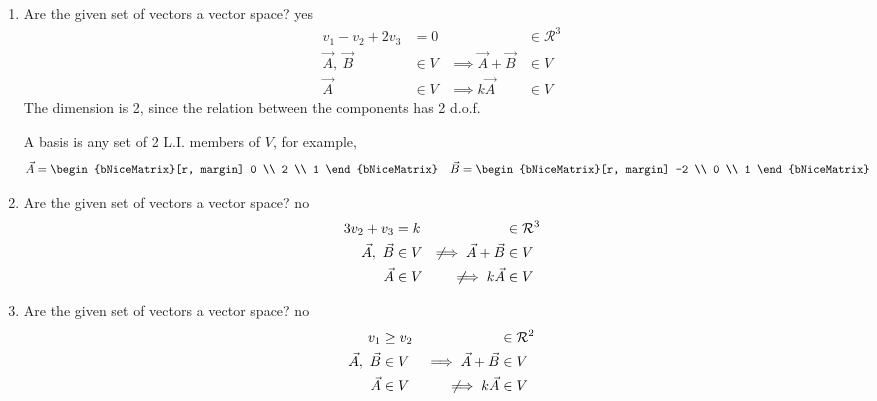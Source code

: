 \begin{enumerate}
    \item Are the given set of vectors a vector space? \textcolor{y_h}{yes}
          \begin{align}
              v_1 - v_2 + 2v_3           & = 0               &
                                         & \in \mathcal{R}^3   \\
              \vec{A},\ \vec{B}          & \in V             &
              \implies \vec{A} + \vec{B} & \in V               \\
              \vec{A}                    & \in V             &
              \implies k\vec{A}          & \in V
          \end{align}
          The dimension is 2, since the relation between the components has 2 d.o.f.
          \par
          A basis is any set of 2 L.I. members of $ V $, for example,
          \begin{align}
              \vec{A} & = \begin{bNiceMatrix}[r, margin]
                              0 \\ 2 \\ 1
                          \end{bNiceMatrix} &
              \vec{B} & = \begin{bNiceMatrix}[r, margin]
                              -2 \\ 0 \\ 1
                          \end{bNiceMatrix}
          \end{align}

    \item Are the given set of vectors a vector space? \textcolor{y_p}{no}
          \begin{align}
              3v_2 + v_3                         & = k               &
                                                 & \in \mathcal{R}^3   \\
              \vec{A},\ \vec{B}                  & \in V             &
              \not\!\!\implies \vec{A} + \vec{B} & \in V               \\
              \vec{A}                            & \in V             &
              \not\!\!\implies k\vec{A}          & \in V
          \end{align}

    \item Are the given set of vectors a vector space? \textcolor{y_p}{no}
          \begin{align}
              v_1                        & \geq v_2          &
                                         & \in \mathcal{R}^2   \\
              \vec{A},\ \vec{B}          & \in V             &
              \implies \vec{A} + \vec{B} & \in V               \\
              \vec{A}                    & \in V             &
              \not\!\!\implies k\vec{A}  & \in V
          \end{align}


\end{enumerate}

